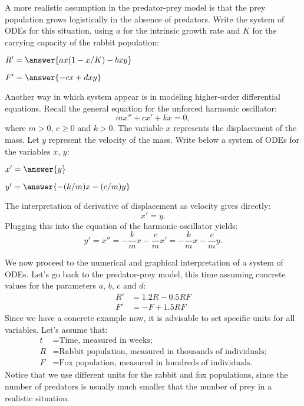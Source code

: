 \documentclass{ximera}
\begin{document}
\begin{problem}
A more realistic assumption in the predator-prey model is that the prey population grows logistically in the absence of predators. Write the system of ODEs for this situation, using $a$ for the intrinsic growth rate and $K$ for the carrying capacity of the rabbit population:
\begin{question}

$R'= \answer{ax(1-x/K)-bxy}$
\end{question}
\begin{question}

$F'= \answer{-cx+dxy}$
\end{question}
\end{problem}

\begin{problem} Another way in which system appear is in modeling higher-order differential equations. Recall the general equation for the unforced harmonic oscillator:
\[
mx''+cx'+kx=0,
\]
where $m>0$, $c\ge 0$ and $k>0$. The variable $x$ represents the displacement of the mass. Let $y$ represent the velocity of the mass. Write below a system of ODEs for the variables $x$, $y$:

\begin{question}
$x'= \answer{y}$
\end{question}

\begin{question}
$y'= \answer{-(k/m)x-(c/m)y}$
\end{question}

\begin{explanation} The interpretation of derivative of displacement as velocity gives directly:
\[
x'=y.
\]
Plugging this into the equation of the harmonic oscillator yields:
\[
y'=x''=-\frac{k}{m}x-\frac{c}{m}x'=-\frac{k}{m}x-\frac{c}{m}y.
\]
\end{explanation}
\end{problem}

We now proceed to the numerical and graphical interpretation of a system of ODEs. Let's go back to the predator-prey model, this time assuming concrete values for the parameters $a$, $b$, $c$ and $d$:
\begin{align}
\label{rabbit-eq-c}R'&=1.2R-0.5RF\\
\label{fox-eq-c}F'&=-F+1.5RF
\end{align}
Since we have a concrete example now, it is advisable to set specific units for all variables. Let's assume that:
\begin{align*}
t&=\text{Time, measured in weeks;}\\
R&=\text{Rabbit population, measured in thousands of individuals;}\\
F&=\text{Fox population, measured in hundreds of individuals.}
\end{align*}
Notice that we use different units for the rabbit and fox populations, since the number of predators is usually much smaller that the number of prey in a realistic situation.
\end{document}
